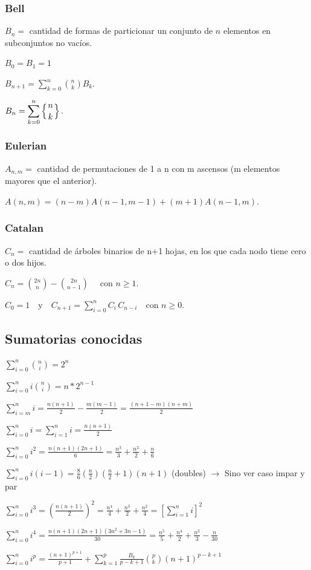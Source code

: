 {{
}
\subsubsection{Bell}
{
\( {\displaystyle B_{n}=} \) cantidad de formas de particionar un conjunto de \(n\) elementos en subconjuntos no vacíos.

\( {\displaystyle B_0= B_1 = 1} \)

\( {\displaystyle B_{n+1}=\sum_{k=0}^{n} \binom{n}{k} B_k.} \) 

\( {\displaystyle B_{n}=\sum _{k=0}^{n}\left\{{n \atop k}\right\}.} \) 


} 
\subsubsection{Eulerian}
{
\( {\displaystyle A_{n, m}=} \) cantidad de permutaciones de 1 a n con m ascensos (m elementos mayores que el anterior).

\( {\displaystyle A(n,m)=(n-m)A(n-1,m-1)+(m+1)A(n-1,m).} \)
}
\subsubsection{Catalan}
{
\( {\displaystyle C_{n}=} \) cantidad de árboles binarios de n+1 hojas, en los que cada nodo tiene cero o dos hijos.

\({\displaystyle C_{n}={2n \choose n}-{2n \choose n-1}\quad {\mbox{ con }}n\geq 1.} \)

\( {\displaystyle C_{0}=1\quad {\mbox{y}}\quad C_{n+1}=\sum _{i=0}^{n}C_{i}\,C_{n-i}\quad {\mbox{con }}n\geq 0.} \)
}

}

\subsection{Sumatorias conocidas}
{
$\sum_{i=0}^n\binom{n}{i}=2^n$

$\sum_{i=0}^n i\binom{n}{i}=n*2^{n-1}$

$\sum_{i=m}^n i = \frac{n(n+1)}{2} - \frac{m(m-1)}{2} = \frac{(n+1-m)(n+m)}{2}$

$\sum_{i=0}^n i = \sum_{i=1}^n i = \frac{n(n+1)}{2}$

$\sum_{i=0}^n i^2 = \frac{n(n+1)(2n+1)}{6} = \frac{n^3}{3} + \frac{n^2}{2} + \frac{n}{6}$

$\sum_{i=0}^n i(i-1) = \frac{8}{6}(\frac{n}{2})(\frac{n}{2}+1)(n+1)$ (doubles) $\rightarrow$ Sino ver caso impar y par

$\sum_{i=0}^n i^3 = \left(\frac{n(n+1)}{2}\right)^2 = \frac{n^4}{4} + \frac{n^3}{2} + \frac{n^2}{4} = \left[\sum_{i=1}^n i\right]^2$

$\sum_{i=0}^n i^4 = \frac{n(n+1)(2n+1)(3n^2+3n-1)}{30} = \frac{n^5}{5} + \frac{n^4}{2} + \frac{n^3}{3} - \frac{n}{30}$

$\sum_{i=0}^n i^p = \frac{(n+1)^{p+1}}{p+1} + \sum_{k=1}^p\frac{B_k}{p-k+1}{p\choose k}(n+1)^{p-k+1}$

}

